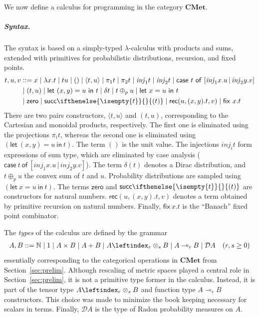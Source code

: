 \documentclass[a4paper,UKenglish,cleveref, autoref, thm-restate]{lipics-v2021}
\providecommand*{\ifempty}[3]{\ifthenelse{\isempty{#1}}{#2}{#3}}
\newcommand{\parensmathoper}[2]{\ensuremath{#1\ifempty{#2}{}{(#2)}}}
\newcommand{\lol}{\mathbin{\multimap}}
\newcommand{\cat}[1]{\mathbf{#1}}
\newcommand{\CMet}{\cat{CMet}}
\newcommand{\nat}{\mathbb{N}}
\newcommand{\unitT}{1}
\newcommand{\uinterval}{[0,1]}
\newcommand{\pair}[2]{\otimes_{#1,#2}}
\renewcommand{\pair}[2]{\leftindex_{#1}\otimes_{#2}} %
\newcommand{\inj}{\mathsf{\mathit{inj}}}
\newcommand{\letIn}[2]{\mathsf{let~} #1 \mathsf{~in~} #2}
\newcommand{\fix}[2]{\mathsf{fix~} #1 . #2 }
\newcommand{\Zero}{\mathsf{zero}}
\newcommand{\Succ}{\parensmathoper{\mathsf{succ}}}
\newcommand{\Rec}[3]{\mathsf{rec}(#1,#2,#3)}
\newcommand{\tuple}[1]{\langle #1 \rangle}
\newcommand{\case}[5]{\mathsf{case~} #1%
    \mathsf{~of~} [\inj_1 #2 . #3 \,|\, \inj_2 #4 . #5]%
}
\newcommand{\TD}{\mathcal{D}}
\begin{document}
We now define a calculus for programming in the category $\CMet$. 
\subparagraph*{Syntax.}
The syntax is based on a simply-typed $\lambda$-calculus with products and sums, extended with primitives for probabilistic distributions, recursion, and fixed points. 
%
\begin{align*}
 t, u, v &{} ::= {}
  x \mid \lambda x. t \mid t u \mid
 () \mid 
 \tuple{t,u} \mid \pi_1 t \mid \pi_2 t \mid
 \inj_1 t \mid \inj_2 t \mid \case{t}{x}{u}{y}{v}
 \\
 &\mid  (t,u) \mid \letIn{(x,y) = u }{t} %
 \mid \delta t \mid  t \oplus_p u \mid \letIn{x = u}{t} \\
 &\mid \Zero \mid \Succ{t} \mid \Rec{u}{(x,y).t}{v} %
 \mid \fix{x}{t}
\end{align*}
%
There are two pairs constructors, $\tuple{t,u}$ and $(t,u)$, corresponding to the Cartesian and monoidal products, respectively. The first one is eliminated using the projections $\pi_i t$, whereas the second one is eliminated using $(\letIn{(x,y) = u }{t})$. The term $()$ is the unit value. The injections $\inj_i t$ form expressions of sum type, which are eliminated by case analysis ($\case{t}{x}{u}{y}{v}$). 
The term $\delta(t)$ denotes a Dirac distribution, and $t \oplus_p u$ the
convex sum of $t$ and $u$. Probability distributions are  sampled using $(\letIn{x = u}{t})$. The terms $\Zero$ and $\Succ{t}$ are constructors for natural numbers. $\Rec{u}{(x,y).t}{v}$ denotes a term obtained by primitive recursion on natural numbers. Finally, $\fix{x}{t}$ is the ``Banach'' fixed point combinator. 

The \emph{types} of the calculus are defined by the grammar  
\begin{align*}
    A,B ::= %
    \nat \mid
    \unitT \mid 
    A \times B \mid 
    A + B \mid 
    A \pair{r}{s} B \mid A \lol_r B \mid 
    \TD A
    && \text{($r,s\geq 0$)}
\end{align*}
essentially corresponding to the categorical operations in $\CMet$ from Section~\ref{sec:prelim}.
Although rescaling of metric spaces played a central role in Section~\ref{sec:prelim}, it is not a primitive type former in the calculus. Instead, it is part of the tensor type $A \pair{r}{s} B$ and function type $A \lol_r B$ constructors. This choice was made to minimize the book keeping necessary for scalars in terms. Finally, $\TD A$ is the type of Radon probability measures on $A$.
\end{document}
